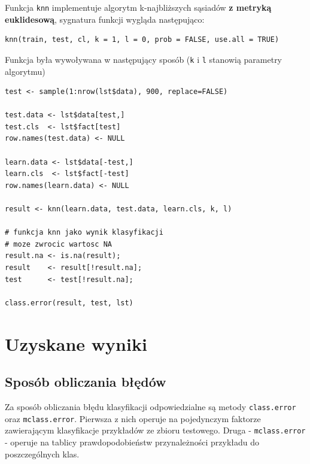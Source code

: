 \documentclass[a4paper,12pt]{article}
\begin{document}
	Funkcja \texttt{knn} implementuje algorytm k-najbliższych sąsiadów
	\textbf{z metryką euklidesową},
	sygnatura funkcji wygląda następująco:
\begin{verbatim}
knn(train, test, cl, k = 1, l = 0, prob = FALSE, use.all = TRUE)
\end{verbatim}

	Funkcja była wywoływana w następujący sposób (\texttt{k} i 
	\texttt{l} stanowią parametry
	algorytmu)
\begin{verbatim}
test <- sample(1:nrow(lst$data), 900, replace=FALSE)

test.data <- lst$data[test,]
test.cls  <- lst$fact[test]
row.names(test.data) <- NULL

learn.data <- lst$data[-test,]
learn.cls  <- lst$fact[-test]
row.names(learn.data) <- NULL

result <- knn(learn.data, test.data, learn.cls, k, l)

# funkcja knn jako wynik klasyfikacji
# moze zwrocic wartosc NA
result.na <- is.na(result);
result    <- result[!result.na];
test      <- test[!result.na];

class.error(result, test, lst)
\end{verbatim}

\section{Uzyskane wyniki}

	\subsection{Sposób obliczania błędów}
	
		Za sposób obliczania błędu klasyfikacji 
		odpowiedzialne są metody \texttt{class.error} oraz
		\texttt{mclass.error}. Pierwsza z nich operuje na
		pojedynczym faktorze zawierającym klasyfikacje 
		przykładów ze zbioru testowego. Druga - \texttt{mclass.error} - 
		operuje na tablicy prawdopodobieństw przynależności przykładu
		do poszczególnych klas.
		
\end{document}
